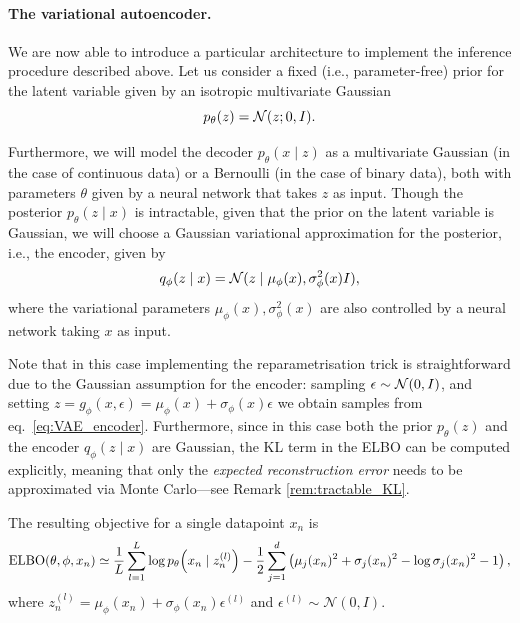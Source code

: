 \paragraph{The variational autoencoder.} We are now able to introduce a particular architecture to implement the inference procedure described above. Let us consider a fixed (i.e., parameter-free) prior for the latent variable given by an isotropic multivariate Gaussian 
\begin{equation}
    p_\theta(z) = {\mathcal N}(z;0,I).
\end{equation} 

Furthermore, we will model the decoder $p_\theta(x \mid z)$ as a multivariate Gaussian (in the case of continuous data) or a Bernoulli (in the case of binary data), both with parameters $\theta$ given by a neural network that takes $z$ as input. Though the posterior $p_\theta(z \mid x)$ is intractable, given that the prior on the latent variable is Gaussian, we will choose a Gaussian variational approximation for the posterior, i.e., the encoder, given by
\begin{equation}
    q_\phi(z \mid x) = {\mathcal N}(z \mid \mu_\phi(x), \sigma^2_\phi(x) I),
    \label{eq:VAE_encoder}
\end{equation}
where the variational parameters  $\mu_\phi(x), \sigma^2_\phi(x)$ are also controlled by a neural network taking $x$ as input. 

Note that in this case implementing the reparametrisation trick is straightforward due to the Gaussian assumption for the encoder: sampling $\epsilon\sim{\mathcal N}(0,I)$, and setting $z = g_\phi(x, \epsilon) = \mu_\phi(x) + \sigma_\phi(x)\epsilon$ we obtain samples from eq.~\eqref{eq:VAE_encoder}. Furthermore, since in this case both the prior $p_\theta(z)$ and the encoder $q_\phi(z \mid x)$ are Gaussian, the KL term in the ELBO can be computed explicitly, meaning that only the \emph{expected reconstruction error} needs to be approximated via Monte Carlo---see Remark  \ref{rem:tractable_KL}. 

The resulting objective for a single datapoint $x_n$ is
\begin{equation}
{\text{ELBO}}(\theta,\phi,x_n)
\simeq 
\frac{1}{L}\sum_{l=1}^{L}
\log p_\theta\!\left(
x_n \mid 
z_n^{(l)}
\right)
-
\frac{1}{2}\sum_{j=1}^{d}
\left(
\mu_j(x_n)^2 + \sigma_j(x_n)^2
- \log \sigma_j(x_n)^2 - 1
\right),
\end{equation}
where $z_n^{(l)} =\mu_\phi(x_n) + \sigma_\phi(x_n)\epsilon^{(l)}$ and $\epsilon^{(l)} \sim \mathcal{N}(0,I)$.

